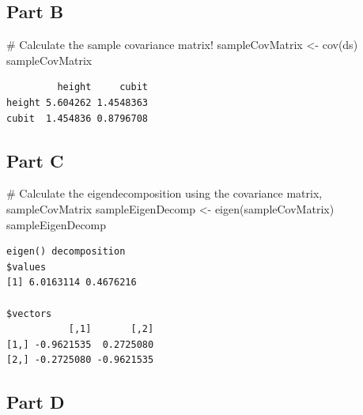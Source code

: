 \documentclass[
  letterpaper,
  DIV=11,
  numbers=noendperiod]{scrartcl}
\newenvironment{Shaded}{}{}
\newcommand{\CommentTok}[1]{\textcolor[rgb]{0.57,0.51,0.45}{#1}}
\newcommand{\FunctionTok}[1]{\textcolor[rgb]{0.41,0.62,0.42}{#1}}
\newcommand{\NormalTok}[1]{\textcolor[rgb]{0.24,0.22,0.21}{#1}}
\newcommand{\OtherTok}[1]{\textcolor[rgb]{0.41,0.62,0.42}{#1}}
\newcommand{\SpecialCharTok}[1]{\textcolor[rgb]{0.69,0.38,0.53}{#1}}
\begin{document}
\newpage{}

\hypertarget{part-b-1}{%
\subsection{Part B}\label{part-b-1}}

\begin{Shaded}
\begin{Highlighting}[]
\CommentTok{\# Calculate the sample covariance matrix!}
\NormalTok{sampleCovMatrix }\OtherTok{\textless{}{-}} \FunctionTok{cov}\NormalTok{(ds)}
\NormalTok{sampleCovMatrix}
\end{Highlighting}
\end{Shaded}

\begin{verbatim}
         height     cubit
height 5.604262 1.4548363
cubit  1.454836 0.8796708
\end{verbatim}

\newpage{}

\hypertarget{part-c-1}{%
\subsection{Part C}\label{part-c-1}}

\begin{Shaded}
\begin{Highlighting}[]
\CommentTok{\# Calculate the eigendecomposition using the covariance matrix, sampleCovMatrix}
\NormalTok{sampleEigenDecomp }\OtherTok{\textless{}{-}} \FunctionTok{eigen}\NormalTok{(sampleCovMatrix)}
\NormalTok{sampleEigenDecomp}
\end{Highlighting}
\end{Shaded}

\begin{verbatim}
eigen() decomposition
$values
[1] 6.0163114 0.4676216

$vectors
           [,1]       [,2]
[1,] -0.9621535  0.2725080
[2,] -0.2725080 -0.9621535
\end{verbatim}

\newpage{}

\hypertarget{part-d-1}{%
\subsection{Part D}\label{part-d-1}}

\begin{Shaded}
\end{Shaded}
\end{document}
